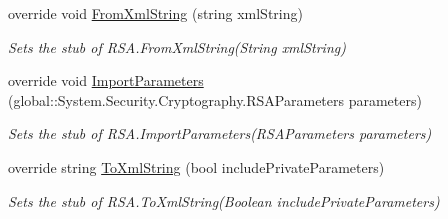 \begin{DoxyCompactItemize}
override void \hyperlink{class_system_1_1_security_1_1_cryptography_1_1_fakes_1_1_stub_r_s_a_a622ec68371f84ada1bc474667933e7da}{From\-Xml\-String} (string xml\-String)
\begin{DoxyCompactList}\small\item\em Sets the stub of R\-S\-A.\-From\-Xml\-String(\-String xml\-String)\end{DoxyCompactList}\item 
override void \hyperlink{class_system_1_1_security_1_1_cryptography_1_1_fakes_1_1_stub_r_s_a_a04a9bb4372d371cb95309cf5e5f414af}{Import\-Parameters} (global\-::\-System.\-Security.\-Cryptography.\-R\-S\-A\-Parameters parameters)
\begin{DoxyCompactList}\small\item\em Sets the stub of R\-S\-A.\-Import\-Parameters(\-R\-S\-A\-Parameters parameters)\end{DoxyCompactList}\item 
override string \hyperlink{class_system_1_1_security_1_1_cryptography_1_1_fakes_1_1_stub_r_s_a_afd05fe9d320bca1c6953c86bba872af0}{To\-Xml\-String} (bool include\-Private\-Parameters)
\begin{DoxyCompactList}\small\item\em Sets the stub of R\-S\-A.\-To\-Xml\-String(\-Boolean include\-Private\-Parameters)\end{DoxyCompactList}\end{DoxyCompactItemize}
